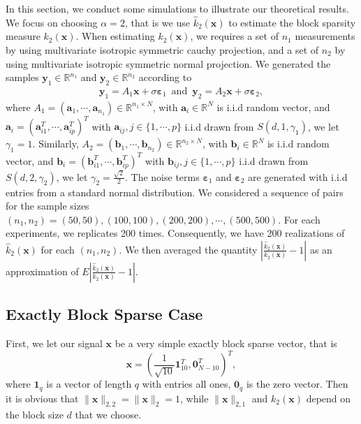 \documentclass[journal,onecolumn]{IEEEtran}
\begin{document}
In this section, we conduct some simulations to illustrate our theoretical results. We focus on choosing $\alpha=2$, that is we use $\hat{k}_2(\mathbf{x})$ to estimate the block sparsity measure $k_2(\mathbf{x})$. When estimating $k_2(\mathbf{x})$, we requires a set of $n_1$ measurements by using multivariate isotropic symmetric cauchy projection, and a set of $n_2$ by using multivariate isotropic symmetric normal projection.  We generated the samples $\mathbf{y}_1\in\mathbb{R}^{n_1}$ and $\mathbf{y}_2\in\mathbb{R}^{n_2}$ according to \begin{align}
\mathbf{y}_1=A_1\mathbf{x}+\sigma\boldsymbol{\varepsilon}_1\,\,\,\text{and}\,\,\,\mathbf{y}_2=A_2\mathbf{x}+\sigma\boldsymbol{\varepsilon}_2,
\end{align}
where $A_1=(\mathbf{a}_1,\cdots,\mathbf{a}_{n_1})\in\mathbb{R}^{n_1\times N}$, with  $\mathbf{a}_i\in\mathbb{R}^N$ is i.i.d random vector, and $\mathbf{a}_i=(\mathbf{a}_{i1}^T,\cdots,\mathbf{a}_{ip}^T)^T$ with $\mathbf{a}_{ij}, j\in\{1,\cdots,p\}$ i.i.d drawn from $S(d,1,\gamma_1)$, we let $\gamma_1=1$. Similarly,  $A_2=(\mathbf{b}_1,\cdots,\mathbf{b}_{n_2})\in\mathbb{R}^{n_2\times N}$, with  $\mathbf{b}_i\in\mathbb{R}^N$ is i.i.d random vector, and $\mathbf{b}_i=(\mathbf{b}_{i1}^T,\cdots,\mathbf{b}_{ip}^T)^T$ with $\mathbf{b}_{ij}, j\in\{1,\cdots,p\}$ i.i.d drawn from $S(d,2,\gamma_2)$, we let $\gamma_2=\frac{\sqrt{2}}{2}$. The noise terms $\boldsymbol{\varepsilon}_1$ and $\boldsymbol{\varepsilon}_2$ are generated with i.i.d entries from a standard normal distribution. We considered a sequence of pairs for the sample sizes $(n_1,n_2)=(50,50),(100,100),(200,200),\cdots,(500,500)$. For each experiments, we replicates 200 times. Consequently, we have 200 realizations of $\hat{k}_2(\mathbf{x})$ for each $(n_1,n_2)$. We then averaged the quantity $|\frac{\hat{k}_2(\mathbf{x})}{k_2(\mathbf{x})}-1|$ as an approximation of $E|\frac{\hat{k}_2(\mathbf{x})}{k_2(\mathbf{x})}-1|$.

\subsection{Exactly Block Sparse Case}
First, we let our signal $\mathbf{x}$ be a very simple exactly block sparse vector, that is
$$
\mathbf{x}=(\frac{1}{\sqrt{10}}\mathbf{1}_{10}^T, \mathbf{0}_{N-10}^T)^T,
$$
where $\mathbf{1}_q$ is a vector of length $q$ with entries all ones, $\mathbf{0}_q$ is the zero vector. Then it is obvious that $\lVert\mathbf{x}\rVert_{2,2}=\lVert\mathbf{x}\rVert_{2}=1$, while $\lVert\mathbf{x}\rVert_{2,1}$ and $k_2(\mathbf{x})$ depend on the block size $d$ that we choose.\\
\end{document}

